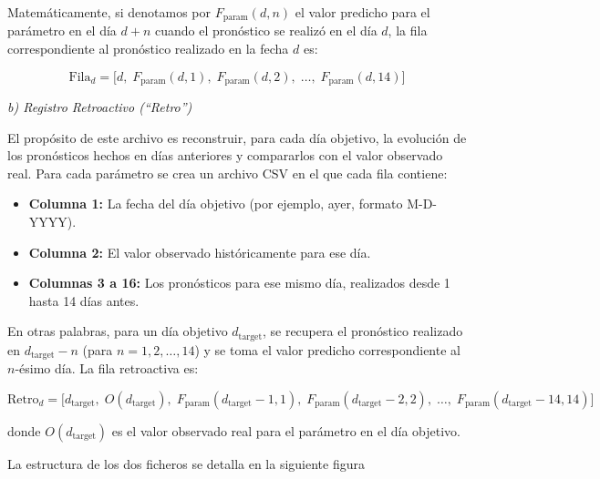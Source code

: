\documentclass[
  10pt,
  a4paper,
  DIV=11,
  numbers=noendperiod,
  open=any]{scrreprt}
\providecommand{\tightlist}{%
  \setlength{\itemsep}{0pt}\setlength{\parskip}{0pt}}
\numberwithin{equation}{chapter}
\numberwithin{equation}{section}
\renewcommand{\[}{\begin{equation}}
\renewcommand{\]}{\end{equation}}
\begin{document}
Matemáticamente, si denotamos por \(F_{\text{param}}(d, n)\) el valor
predicho para el parámetro en el día \(d+n\) cuando el pronóstico se
realizó en el día \(d\), la fila correspondiente al pronóstico realizado
en la fecha \(d\) es:

\begin{equation}
\text{Fila}_d = \bigl[ d,\; F_{\text{param}}(d,1),\; F_{\text{param}}(d,2),\; \dots,\; F_{\text{param}}(d,14) \bigr]
\end{equation}

\emph{b) Registro Retroactivo (``Retro'')}

El propósito de este archivo es reconstruir, para cada día objetivo, la
evolución de los pronósticos hechos en días anteriores y compararlos con
el valor observado real. Para cada parámetro se crea un archivo CSV en
el que cada fila contiene:

\begin{itemize}
\tightlist
\item
  \textbf{Columna 1:} La fecha del día objetivo (por ejemplo, ayer,
  formato M-D-YYYY).
\item
  \textbf{Columna 2:} El valor observado históricamente para ese día.
\item
  \textbf{Columnas 3 a 16:} Los pronósticos para ese mismo día,
  realizados desde 1 hasta 14 días antes.
\end{itemize}

En otras palabras, para un día objetivo \(d_{\text{target}}\), se
recupera el pronóstico realizado en \(d_{\text{target}} - n\) (para
\(n = 1,2,\dots,14\)) y se toma el valor predicho correspondiente al
\(n\)-ésimo día. La fila retroactiva es:

\begin{equation}
\text{Retro}_d = \bigl[ d_{\text{target}},\; O(d_{\text{target}}),\; F_{\text{param}}(d_{\text{target}}-1,1),\; F_{\text{param}}(d_{\text{target}}-2,2),\; \dots,\; F_{\text{param}}(d_{\text{target}}-14,14) \bigr]
\end{equation}

donde \(O(d_{\text{target}})\) es el valor observado real para el
parámetro en el día objetivo.

La estructura de los dos ficheros se detalla en la siguiente figura
\end{document}
